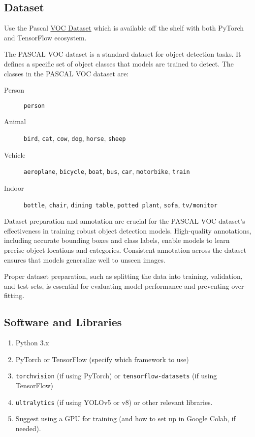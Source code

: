\documentclass[11pt]{article}
\begin{document}
\subsection{Dataset}
\label{sec:org11ca06c}
Use the Pascal \href{http://host.robots.ox.ac.uk/pascal/VOC/}{VOC Dataset} which is available off the
shelf with both PyTorch and TensorFlow ecosystem.

The PASCAL VOC dataset is a standard dataset for object detection tasks. It defines a specific set of object classes that models are trained to detect. The classes in the PASCAL VOC dataset are:

\begin{description}
\item[{Person}] \texttt{person}
\item[{Animal}] \texttt{bird}, \texttt{cat}, \texttt{cow}, \texttt{dog}, \texttt{horse},
\texttt{sheep}
\item[{Vehicle}] \texttt{aeroplane}, \texttt{bicycle}, \texttt{boat}, \texttt{bus},
\texttt{car}, \texttt{motorbike}, \texttt{train}
\item[{Indoor}] \texttt{bottle}, \texttt{chair}, \texttt{dining table}, \texttt{potted
  plant}, \texttt{sofa}, \texttt{tv/monitor}
\end{description}

Dataset preparation and annotation are crucial for the
PASCAL VOC dataset's effectiveness in training robust
object detection models. High-quality annotations,
including accurate bounding boxes and class labels,
enable models to learn precise object locations and
categories. Consistent annotation across the dataset
ensures that models generalize well to unseen images.

Proper dataset preparation, such as splitting the data
into training, validation, and test sets, is essential
for evaluating model performance and preventing
over-fitting.

\subsection{Software and Libraries}
\label{sec:orgfa50c46}
\begin{enumerate}
\item Python 3.x
\item PyTorch or TensorFlow (specify which framework to
use)
\item \texttt{torchvision} (if using PyTorch) or
\texttt{tensorflow-datasets} (if using TensorFlow)
\item \texttt{ultralytics} (if using YOLOv5 or v8) or other
relevant libraries.
\item Suggest using a GPU for training (and how to set up
in Google Colab, if needed).
\end{enumerate}
\end{document}
